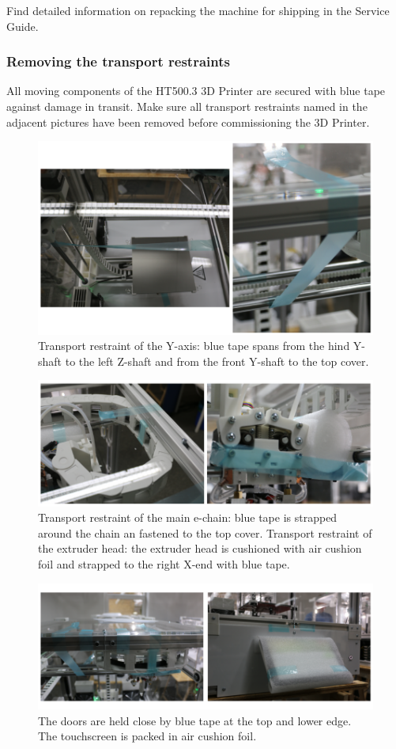 \begin{info}
  Find detailed information on repacking the machine for shipping in the Service Guide.
\end{info}


\subsubsection{Removing the transport restraints}

All moving components of the HT500.3 3D Printer are secured with blue tape against damage in transit.
Make sure all transport restraints named in the adjacent pictures have been removed before commissioning the 3D Printer.

\begin{figure}[H]
  \centering
  \includegraphics[width=.7\linewidth]{./img/secure_yaxis.png}
  \caption{Transport restraint of the Y-axis: blue tape spans from the hind Y-shaft to the left Z-shaft and from the front Y-shaft to the top 
           cover.}
\end{figure}

\begin{figure}[H]
  \centering
  \includegraphics[width=.7\linewidth]{./img/secure_headchain.png}
  \caption{Transport restraint of the main e-chain: blue tape is strapped around the chain an fastened to the top cover.
           Transport restraint of the extruder head: the extruder head is cushioned with air cushion foil and strapped to the 
           right X-end with blue tape.}
\end{figure}

\begin{figure}[H]
  \centering
  \includegraphics[width=.7\linewidth]{./img/secure_doors.png}
  \caption{The doors are held close by blue tape at the top and lower edge.
           The touchscreen is packed in air cushion foil.}
\end{figure}

